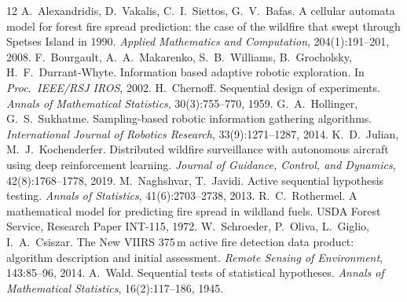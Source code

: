 \documentclass[10pt,a4paper]{article}
\begin{document}
\small

\begin{thebibliography}{12}
A.~Alexandridis, D.~Vakalis, C.~I.~Siettos, G.~V.~Bafas.
\newblock A cellular automata model for forest fire spread prediction: the case of the wildfire that swept through Spetses Island in 1990.
\newblock \emph{Applied Mathematics and Computation}, 204(1):191--201, 2008.
F.~Bourgault, A.~A.~Makarenko, S.~B.~Williams, B.~Grocholsky, H.~F.~Durrant-Whyte.
\newblock Information based adaptive robotic exploration.
\newblock In \emph{Proc.\ IEEE/RSJ IROS}, 2002.
H.~Chernoff.
\newblock Sequential design of experiments.
\newblock \emph{Annals of Mathematical Statistics}, 30(3):755--770, 1959.
G.~A.~Hollinger, G.~S.~Sukhatme.
\newblock Sampling-based robotic information gathering algorithms.
\newblock \emph{International Journal of Robotics Research}, 33(9):1271--1287, 2014.
K.~D.~Julian, M.~J.~Kochenderfer.
\newblock Distributed wildfire surveillance with autonomous aircraft using deep reinforcement learning.
\newblock \emph{Journal of Guidance, Control, and Dynamics}, 42(8):1768--1778, 2019.
M.~Naghshvar, T.~Javidi.
\newblock Active sequential hypothesis testing.
\newblock \emph{Annals of Statistics}, 41(6):2703--2738, 2013.
R.~C.~Rothermel.
\newblock A mathematical model for predicting fire spread in wildland fuels.
\newblock USDA Forest Service, Research Paper INT-115, 1972.
W.~Schroeder, P.~Oliva, L.~Giglio, I.~A.~Csiszar.
\newblock The New VIIRS 375\,m active fire detection data product: algorithm description and initial assessment.
\newblock \emph{Remote Sensing of Environment}, 143:85--96, 2014.
A.~Wald.
\newblock Sequential tests of statistical hypotheses.
\newblock \emph{Annals of Mathematical Statistics}, 16(2):117--186, 1945.
\end{thebibliography}
\end{document}
